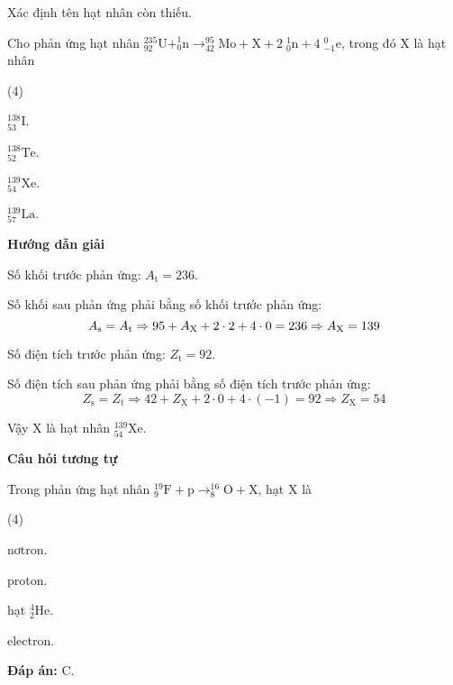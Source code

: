 \begin{dang}{Xác định tên hạt nhân còn thiếu.}
	
	{
		Cho phản ứng hạt nhân $^{235}_{92} \text{U} + ^{1}_{0} \text{n} \longrightarrow ^{95}_{42} \text{Mo} + \text{X} + 2 \; ^{1}_{0} \text{n} + 4 \; ^{0}_{-1} \text{e}$, trong đó X là hạt nhân
		\begin{mcq}(4)
			\item $^{138}_{53} \text{I}$.
			\item $^{138}_{52} \text{Te}$.
			\item $^{139}_{54} \text{Xe}$.
			\item $^{139}_{57} \text{La}$.
		\end{mcq}
	}
	{
		\begin{center}
			\textbf{Hướng dẫn giải}
		\end{center}
		
		Số khối trước phản ứng: $A_\text{t} = 236$.
		
		Số khối sau phản ứng phải bằng số khối trước phản ứng:
		$$A_\text{s} = A_\text{t} \Rightarrow 95+A_\text X+2\cdot 2 + 4 \cdot 0 = 236 \Rightarrow A_\text X = 139$$
		
		Số điện tích trước phản ứng: $Z_\text{t} = 92$.
		
		Số điện tích sau phản ứng phải bằng số điện tích trước phản ứng:
		$$Z_\text{s} = Z_\text{t} \Rightarrow 42 + Z_\text{X} + 2 \cdot 0 + 4 \cdot(-1) = 92 \Rightarrow Z_\text{X} = 54$$
		
		Vậy X là hạt nhân $ ^{139}_{54} \text{Xe}$.
		
		\begin{center}
			\textbf{Câu hỏi tương tự}
		\end{center}
		
		Trong phản ứng hạt nhân $^{19}_{9} \text{F} + \text{p} \longrightarrow ^{16}_{8} \text{O} + \text{X}$, hạt X là
		\begin{mcq}(4)
			\item nơtron. 
			\item proton. 
			\item hạt $^{4}_{2} \text{He}$. 
			\item electron.
		\end{mcq}
		\textbf{Đáp án:} C.
	}
	

\end{dang}
